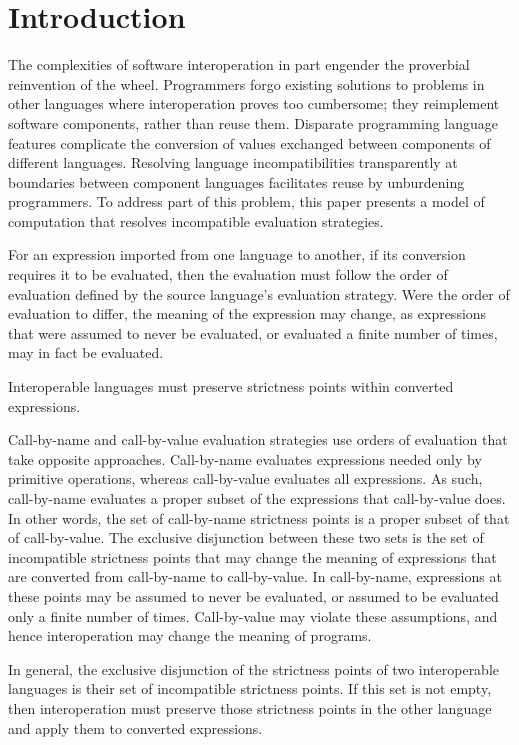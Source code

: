 \section{Introduction}

The complexities of software interoperation in part engender the proverbial reinvention of the wheel. Programmers forgo existing solutions to problems in other languages where interoperation proves too cumbersome; they reimplement software components, rather than reuse them. Disparate programming language features complicate the conversion of values exchanged between components of different languages. Resolving language incompatibilities transparently at boundaries between component languages facilitates reuse by unburdening programmers. To address part of this problem, this paper presents a model of computation that resolves incompatible evaluation strategies.

For an expression imported from one language to another, if its conversion requires it to be evaluated, then the evaluation must follow the order of evaluation defined by the source language's evaluation strategy. Were the order of evaluation to differ, the meaning of the expression may change, as expressions that were assumed to never be evaluated, or evaluated a finite number of times, may in fact be evaluated.



Interoperable languages must preserve strictness points within converted expressions. 

Call-by-name and call-by-value evaluation strategies use orders of evaluation that take opposite approaches. Call-by-name evaluates expressions needed only by primitive operations, whereas call-by-value evaluates all expressions. As such, call-by-name evaluates a proper subset of the expressions that call-by-value does. In other words, the set of call-by-name strictness points is a proper subset of that of call-by-value. The exclusive disjunction between these two sets is the set of incompatible strictness points that may change the meaning of expressions that are converted from call-by-name to call-by-value. In call-by-name, expressions at these points may be assumed to never be evaluated, or assumed to be evaluated only a finite number of times. Call-by-value may violate these assumptions, and hence interoperation may change the meaning of programs.

In general, the exclusive disjunction of the strictness points of two interoperable languages is their set of incompatible strictness points. If this set is not empty, then interoperation must preserve those strictness points in the other language and apply them to converted expressions. 

